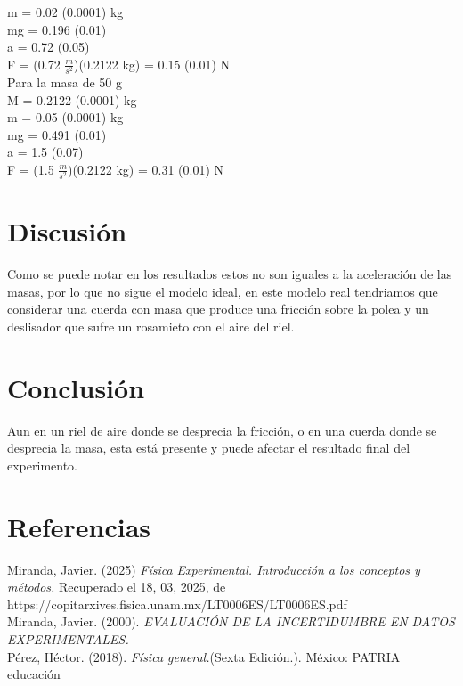 \documentclass[12pt,a4paper]{article}
\begin{document}
m = 0.02 (0.0001) kg \\

mg = 0.196 (0.01) \\

a = 0.72 (0.05) \\

F = (0.72 $\frac{m}{s^2}$)(0.2122 kg) = 0.15 (0.01) N \\

Para la masa de 50 g\\

M = 0.2122 (0.0001) kg \\

m = 0.05 (0.0001) kg \\

mg = 0.491 (0.01) \\

a = 1.5 (0.07) \\

F = (1.5 $\frac{m}{s^2}$)(0.2122 kg) = 0.31 (0.01) N \\


\section{Discusión}

Como se puede notar en los resultados estos no son iguales a la aceleración de las masas, por lo que no sigue el modelo ideal, en este modelo real tendriamos que considerar una cuerda con masa que produce una fricción sobre la polea y un deslisador que sufre un rosamieto con el aire del riel. 

\section{Conclusión}

Aun en un riel de aire donde se desprecia la fricción, o en una cuerda donde se desprecia la masa, esta está presente y puede afectar el resultado final del experimento.  

\section{Referencias}

Miranda, Javier. (2025) \textit{Física Experimental. Introducción a los conceptos y métodos.} Recuperado el 18, 03, 2025, de https://copitarxives.fisica.unam.mx/LT0006ES/LT0006ES.pdf \\

Miranda, Javier. (2000). \textit{EVALUACIÓN DE LA INCERTIDUMBRE EN DATOS EXPERIMENTALES.} \\

Pérez, Héctor. (2018). \textit{Física general.}(Sexta Edición.). México: PATRIA educación \\
\end{document}
